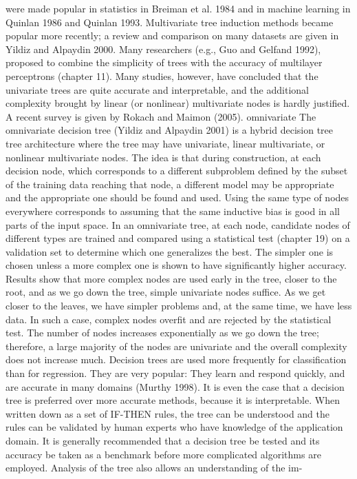 were made popular in statistics in Breiman et al. 1984 and in machine learning in Quinlan 1986 and Quinlan 1993. Multivariate tree induction methods became popular more recently; a review and comparison on many datasets are given in Yildiz and Alpaydin 2000. Many researchers (e.g., Guo and Gelfand 1992), proposed to combine the simplicity of trees with the accuracy of multilayer perceptrons (chapter 11). Many studies, however, have concluded that the univariate trees are quite accurate and interpretable, and the additional complexity brought by linear (or nonlinear) multivariate nodes is hardly justified. A recent survey is given by Rokach and Maimon (2005). omnivariate The omnivariate decision tree (Yildiz and Alpaydin 2001) is a hybrid decision tree tree architecture where the tree may have univariate, linear multivariate, or nonlinear multivariate nodes. The idea is that during construction, at each decision node, which corresponds to a different subproblem defined by the subset of the training data reaching that node, a different model may be appropriate and the appropriate one should be found and used. Using the same type of nodes everywhere corresponds to assuming that the same inductive bias is good in all parts of the input space. In an omnivariate tree, at each node, candidate nodes of different types are trained and compared using a statistical test (chapter 19) on a validation set to determine which one generalizes the best. The simpler one is chosen unless a more complex one is shown to have significantly higher accuracy. Results show that more complex nodes are used early in the tree, closer to the root, and as we go down the tree, simple univariate nodes suffice. As we get closer to the leaves, we have simpler problems and, at the same time, we have less data. In such a case, complex nodes overfit and are rejected by the statistical test. The number of nodes increases exponentially as we go down the tree; therefore, a large majority of the nodes are univariate and the overall complexity does not increase much. Decision trees are used more frequently for classification than for regression. They are very popular: They learn and respond quickly, and are accurate in many domains (Murthy 1998). It is even the case that a decision tree is preferred over more accurate methods, because it is interpretable. When written down as a set of IF-THEN rules, the tree can be understood and the rules can be validated by human experts who have knowledge of the application domain. It is generally recommended that a decision tree be tested and its accuracy be taken as a benchmark before more complicated algorithms are employed. Analysis of the tree also allows an understanding of the im-

